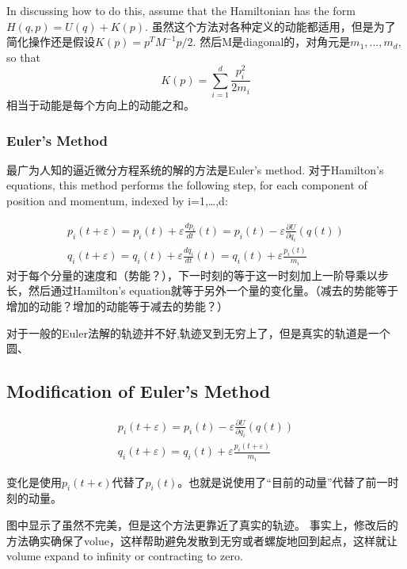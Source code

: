 \documentclass[
]{book}
\theoremstyle{definition}
\theoremstyle{definition}
\theoremstyle{definition}
\theoremstyle{remark}
\begin{document}
In discussing how to do this, assume that the Hamiltonian has the form \(H(q,p)=U(q)+K(p)\). 虽然这个方法对各种定义的动能都适用，但是为了简化操作还是假设\(K(p)=p^{T} M^{-1} p / 2\). 然后M是diagonal的，对角元是\(m_1,...,m_d\), so that
\[
K(p)=\sum_{i=1}^{d} \frac{p_{i}^{2}}{2 m_{i}}
\]
相当于动能是每个方向上的动能之和。

\hypertarget{eulers-method}{%
\subsubsection{Euler's Method}\label{eulers-method}}

最广为人知的逼近微分方程系统的解的方法是Euler's method. 对于Hamilton's equations, this method performs the following step, for each component of position and momentum, indexed by i=1,\ldots,d:

\[
\begin{array}{l}{p_{i}(t+\varepsilon)=p_{i}(t)+\varepsilon \frac{d p_{i}}{d t}(t)=p_{i}(t)-\varepsilon \frac{\partial U}{\partial q_{i}}(q(t))} \\ {q_{i}(t+\varepsilon)=q_{i}(t)+\varepsilon \frac{d q_{i}}{d t}(t)=q_{i}(t)+\varepsilon \frac{p_{i}(t)}{m_{i}}}\end{array}
\]
对于每个分量的速度和（势能？），下一时刻的等于这一时刻加上一阶导乘以步长，然后通过Hamilton's equation就等于另外一个量的变化量。（减去的势能等于增加的动能？增加的动能等于减去的势能？）

对于一般的Euler法解的轨迹并不好,轨迹叉到无穷上了，但是真实的轨道是一个圆、

\hypertarget{modification-of-eulers-method}{%
\subsection{Modification of Euler's Method}\label{modification-of-eulers-method}}

\[
\begin{array}{c}{p_{i}(t+\varepsilon)=p_{i}(t)-\varepsilon \frac{\partial U}{\partial q_{i}}(q(t))} \\ {q_{i}(t+\varepsilon)=q_{i}(t)+\varepsilon \frac{p_{i}(t+\varepsilon)}{m_{i}}}\end{array}
\]

变化是使用\(p_i(t+\epsilon)\)代替了\(p_i(t)\)。也就是说使用了``目前的动量''代替了前一时刻的动量。

图中显示了虽然不完美，但是这个方法更靠近了真实的轨迹。 事实上，修改后的方法确实确保了volue，这样帮助避免发散到无穷或者螺旋地回到起点，这样就让volume expand to infinity or contracting to zero.
\end{document}
